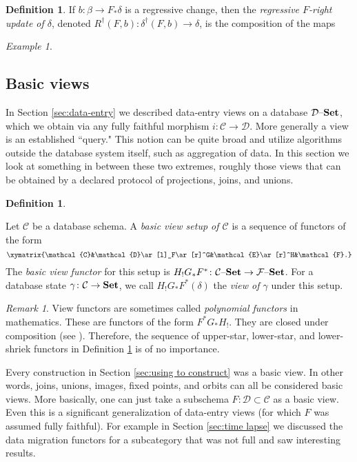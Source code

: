 \documentclass{amsart}
\def\mc{\mathcal}
\def\to{\rightarrow}
\def\taking{\colon}
\def\ss{\subset}
\def\Set{{\bf Set}}
\def\set{{\text \textendash}{\bf Set}}
\def\mcC{\mc{C}}
\def\mcD{\mc{D}}
\def\mcE{\mc{E}}
\def\mcF{\mc{F}}
\theoremstyle{remark}
\newtheorem{remark}[theorem]{Remark}
\newtheorem{example}[theorem]{Example}
\theoremstyle{definition}
\newtheorem{definition}[theorem]{Definition}
\begin{document}
{\begin{definition}
If $b\taking \beta\to F_*\delta$ is a regressive change, then the {\em regressive $F$-right update of $\delta$}, denoted $R^\dagger(F,b)\taking\delta^\dagger(F,b)\to\delta$, is the composition of the maps $$\

\end{definition}

\begin{example}

\end{example}

} %

\subsection{Basic views}\label{sec:views}

In Section \ref{sec:data-entry} we described data-entry views on a database $\mcD\set$, which we obtain via any fully faithful morphism $i\taking\mcC\to\mcD$.  More generally a view is an established ``query."   This notion can be quite broad and utilize algorithms outside the database system itself, such as aggregation of data.  In this section we look at something in between these two extremes, roughly those views that can be obtained by a declared protocol of projections, joins, and unions.

\begin{definition}\label{def:view}

Let $\mcC$ be a database schema.  A {\em basic view setup of $\mcC$} is a sequence of functors of the form $$\xymatrix{\mcC&\mcD\ar[l]_F\ar[r]^G&\mcE\ar[r]^H&\mcF.}$$  The {\em basic view functor} for this setup is $H_!G_*F^*\taking\mcC\set\to\mcF\set$.  For a database state $\gamma\taking\mcC\to\Set$, we call $H_!G_*F^*(\delta)$ the {\em view of $\gamma$} under this setup. 

\end{definition}

\begin{remark}

View functors are sometimes called {\em polynomial functors} in mathematics.  These are functors of the form $F^*G_*H_!$.  They are closed under composition (see \cite[Corollary 1.1.4]{GK}).  Therefore, the sequence of upper-star, lower-star, and lower-shriek functors in Definition \ref{def:view} is of no importance.  

\end{remark}

Every construction in Section \ref{sec:using to construct} was a basic view.  In other words, joins, unions, images, fixed points, and orbits can all be considered basic views.  More basically, one can just take a subschema $F\taking\mcD\ss\mcC$ as a basic view.  Even this is a significant generalization of data-entry views (for which $F$ was assumed fully faithful).  For example in Section \ref{sec:time lapse} we discussed the data migration functors for a subcategory that was not full and saw interesting results.
\end{document}
